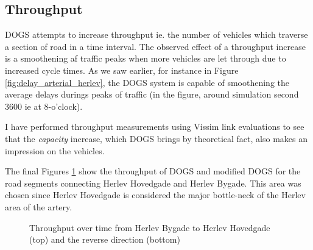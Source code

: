 \subsection{Throughput}
DOGS attempts to increase throughput ie. the number of vehicles which traverse a section of road in a time interval. The observed effect of a throughput increase is a smoothening af traffic peaks when more vehicles are let through due to increased cycle times. As we saw earlier, for instance in Figure \ref{fig:delay_arterial_herlev}, the DOGS system is capable of smoothening the average delays durings peaks of traffic (in the figure, around simulation second 3600 ie at 8-o'clock).

I have performed throughput measurements using Vissim link evaluations to see that the \textit{capacity} increase, which DOGS brings by theoretical fact, also makes an impression on the vehicles.

The final Figures \ref{fig:volume_hb-hh} show the throughput of DOGS and modified DOGS for the road segments connecting Herlev Hovedgade and Herlev Bygade. This area was chosen since Herlev Hovedgade is considered the major bottle-neck of the Herlev area of the artery.

\begin{figure}[htbp]
\centering
{}

\caption{Throughput over time from Herlev Bygade to Herlev Hovedgade (top) and the reverse direction (bottom)}
\label{fig:volume_hb-hh}
\end{figure}

